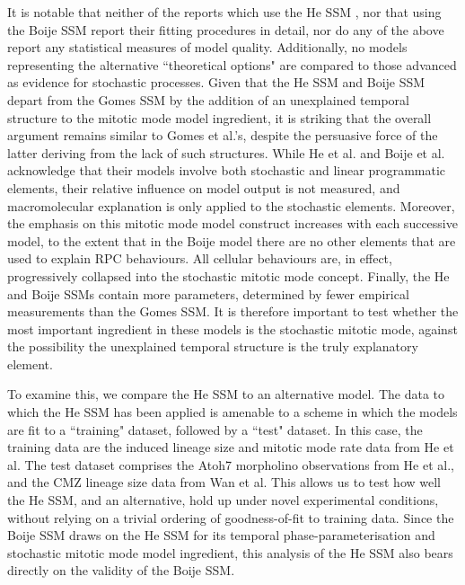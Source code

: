 It is notable that neither of the reports which use the He SSM \cite{He2012,Wan2016}, nor that using the Boije SSM \cite{Boije2015} report their fitting procedures in detail, nor do any of the above report any statistical measures of model quality. Additionally, no models representing the alternative ``theoretical options" are compared to those advanced as evidence for stochastic processes. Given that the He SSM and Boije SSM depart from the Gomes SSM by the addition of an unexplained temporal structure to the mitotic mode model ingredient, it is striking that the overall argument remains similar to Gomes et al.'s, despite the persuasive force of the latter deriving from the lack of such structures. While He et al. and Boije et al. acknowledge that their models involve both stochastic and linear programmatic elements, their relative influence on model output is not measured, and macromolecular explanation is only applied to the stochastic elements. Moreover, the emphasis on this mitotic mode model construct increases with each successive model, to the extent that in the Boije model there are no other elements that are used to explain RPC behaviours. All cellular behaviours are, in effect, progressively collapsed into the stochastic mitotic mode concept. Finally, the He and Boije SSMs contain more parameters, determined by fewer empirical measurements than the Gomes SSM. It is therefore important to test whether the most important ingredient in these models is the stochastic mitotic mode, against the possibility the unexplained temporal structure is the truly explanatory element.

To examine this, we compare the He SSM to an alternative model. The data to which the He SSM has been applied is amenable to a scheme in which the models are fit to a ``training" dataset, followed by a ``test" dataset. In this case, the training data are the induced lineage size and mitotic mode rate data from He et al. The test dataset comprises the Atoh7 morpholino observations from He et al., and the CMZ lineage size data from Wan et al. This allows us to test how well the He SSM, and an alternative, hold up under novel experimental conditions, without relying on a trivial ordering of goodness-of-fit to training data. Since the Boije SSM draws on the He SSM for its temporal phase-parameterisation and stochastic mitotic mode model ingredient, this analysis of the He SSM also bears directly on the validity of the Boije SSM.

